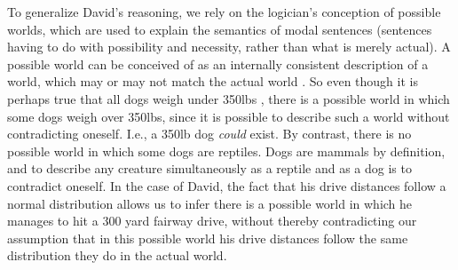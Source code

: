 \documentclass[12pt]{article}
\begin{document}
%
To generalize David's reasoning, we rely on the logician's conception of possible worlds, which are used to explain the semantics of modal sentences (sentences having to do with possibility and necessity, rather than what is merely actual). 
%
A possible world can be conceived of as an internally consistent description of a world, which may or may not match the actual world \citep[][though for an opposing perspective on modal ontology see \citealp{Lewis1986}]{Adams1974}. 
%
So even though it is perhaps true that all dogs weigh under 350lbs \citep[the heaviest recorded dog weighed 343lbs;][]{Young1994}, there is a possible world in which some dogs weigh over 350lbs, since it is possible to describe such a world without contradicting oneself.
%
I.e., a 350lb dog \textit{could} exist.
%
%
By contrast, there is no possible world in which some dogs are reptiles. 
%
Dogs are mammals by definition, and to describe any creature simultaneously as a reptile and as a dog is to contradict oneself. 
%
% 
In the case of David, the fact that his drive distances follow a normal distribution allows us to infer there is a possible world in which he manages to hit a 300 yard fairway drive, without thereby contradicting our assumption that in this possible world his drive distances follow the same distribution they do in the actual world.
%
%
\end{document}
